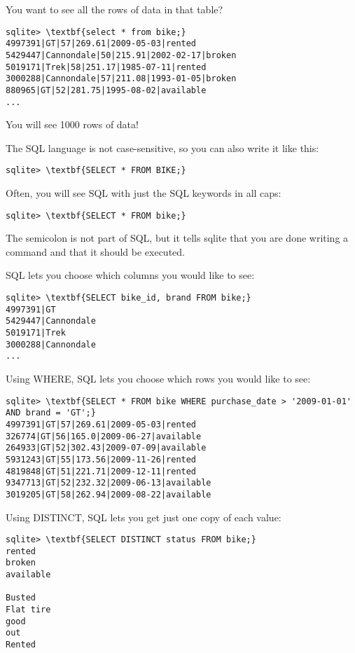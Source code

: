 You want to see all the rows of data in that table?

\begin{Verbatim}[commandchars=\\\{\}]
sqlite> \textbf{select * from bike;}
4997391|GT|57|269.61|2009-05-03|rented
5429447|Cannondale|50|215.91|2002-02-17|broken
5019171|Trek|58|251.17|1985-07-11|rented
3000288|Cannondale|57|211.08|1993-01-05|broken
880965|GT|52|281.75|1995-08-02|available
...
\end{Verbatim}

You will see 1000 rows of data!

The SQL language is not case-sensitive, so you can also write it like this:
\begin{Verbatim}[commandchars=\\\{\}]
sqlite> \textbf{SELECT * FROM BIKE;}    
\end{Verbatim}

Often, you will see SQL with just the SQL keywords in all caps:
\begin{Verbatim}[commandchars=\\\{\}]
sqlite> \textbf{SELECT * FROM bike;}    
\end{Verbatim}
The semicolon is not part of SQL, but it tells sqlite that you are done writing a command and that it should be executed.

SQL lets you choose which columns you would like to see:
\begin{Verbatim}[commandchars=\\\{\}]
sqlite> \textbf{SELECT bike_id, brand FROM bike;}
4997391|GT
5429447|Cannondale
5019171|Trek
3000288|Cannondale
...
\end{Verbatim}

Using WHERE, SQL lets you choose which rows you would like to see:
\begin{Verbatim}[commandchars=\\\{\}]
sqlite> \textbf{SELECT * FROM bike WHERE purchase_date > '2009-01-01' AND brand = 'GT';}
4997391|GT|57|269.61|2009-05-03|rented
326774|GT|56|165.0|2009-06-27|available
264933|GT|52|302.43|2009-07-09|available
5931243|GT|55|173.56|2009-11-26|rented
4819848|GT|51|221.71|2009-12-11|rented
9347713|GT|52|232.32|2009-06-13|available
3019205|GT|58|262.94|2009-08-22|available    
\end{Verbatim}

Using DISTINCT, SQL lets you get just one copy of each value:
\begin{Verbatim}[commandchars=\\\{\}]
sqlite> \textbf{SELECT DISTINCT status FROM bike;}
rented
broken
available

Busted
Flat tire
good
out
Rented
\end{Verbatim}

